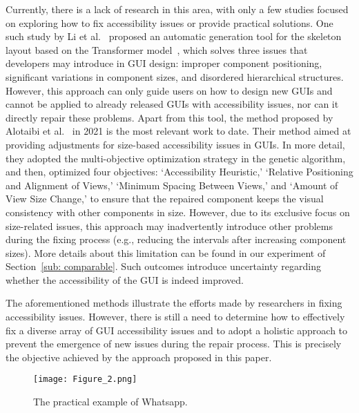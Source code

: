 Currently, there is a lack of research in this area, with only a few studies focused on exploring how to fix accessibility issues or provide practical solutions.
One such study by Li et al.~\cite{Li2020AutoCO} proposed an automatic generation tool for the skeleton layout based on the Transformer model~\cite{Li2020AutoCO}, which solves three issues that developers may introduce in GUI design: improper component positioning, significant variations in component sizes, and disordered hierarchical structures. 
However, this approach can only guide users on how to design new GUIs and cannot be applied to already released GUIs with accessibility issues, nor can it directly repair these problems.
Apart from this tool, the method proposed by Alotaibi et al.~\cite{Alotaibi2021AutomatedRO} in 2021 is the most relevant work to date.
Their method aimed at providing adjustments for size-based accessibility issues in GUIs. 
In more detail, they adopted the multi-objective optimization strategy in the genetic algorithm, and then, optimized four objectives: `Accessibility Heuristic,' `Relative Positioning and Alignment of Views,' `Minimum Spacing Between Views,' and `Amount of View Size Change,' to ensure that the repaired component keeps the visual consistency with other components in size. 
However, due to its exclusive focus on size-related issues, this approach may inadvertently introduce other problems during the fixing process (e.g., reducing the intervals after increasing component sizes). 
More details about this limitation can be found in our experiment of Section~\ref{sub: comparable}.
Such outcomes introduce uncertainty regarding whether the accessibility of the GUI is indeed improved.

The aforementioned methods illustrate the efforts made by researchers in fixing accessibility issues.
However, there is still a need to determine how to effectively fix a diverse array of GUI accessibility issues and to adopt a holistic approach to prevent the emergence of new issues during the repair process.
This is precisely the objective achieved by the approach proposed in this paper.


\begin{figure}
\centering
\texttt{[image: Figure\_2.png]}
\caption{The practical example of Whatsapp.}
\label{fig: whatsapp}
\end{figure}
